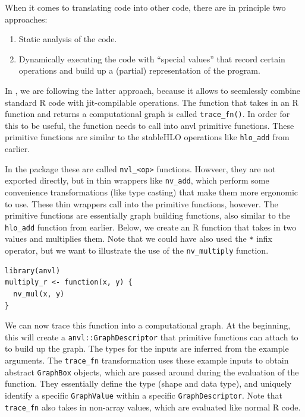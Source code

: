 When it comes to translating code into other code, there are in principle two approaches:

\begin{enumerate}
\def\labelenumi{\arabic{enumi}.}
\tightlist
\item
  Static analysis of the code.
\item
  Dynamically executing the code with ``special values'' that record certain operations and build up a (partial) representation of the program.
\end{enumerate}

In , we are following the latter approach, because it allows to seemlessly combine standard R code with jit-compilable operations.
The function that takes in an R function and returns a computational graph is called \texttt{trace\_fn()}.
In order for this to be useful, the function needs to call into anvl primitive functions.
These primitive functions are similar to the stableHLO operations like \texttt{hlo\_add} from earlier.

In the  package these are called \texttt{nvl\_\textless{}op\textgreater{}} functions.
Howveer, they are not exported directly, but in thin wrappers like \texttt{nv\_add}, which perform some convenience transformations (like type casting) that make them more ergonomic to use.
These thin wrappers call into the primitive functions, however.
The primitive functions are essentially graph building functions, also similar to the \texttt{hlo\_add} function from earlier.
Below, we create an R function that takes in two values and multiplies them.
Note that we could have also used the \texttt{*} infix operator, but we want to illustrate the use of the \texttt{nv\_multiply} function.

\begin{verbatim}
library(anvl)
multiply_r <- function(x, y) {
  nv_mul(x, y)
}
\end{verbatim}

We can now trace this function into a computational graph.
At the beginning, this will create a \texttt{anvl::GraphDescriptor} that primitive functions can attach to to build up the graph.
The types for the inputs are inferred from the example arguments.
The \texttt{trace\_fn} transformation uses these example inputs to obtain abstract \texttt{GraphBox} objects, which are passed around during the evaluation of the function.
They essentially define the type (shape and data type), and uniquely identify a specific \texttt{GraphValue} within a specific \texttt{GraphDescriptor}.
Note that \texttt{trace\_fn} also takes in non-array values, which are evaluated like normal R code.

